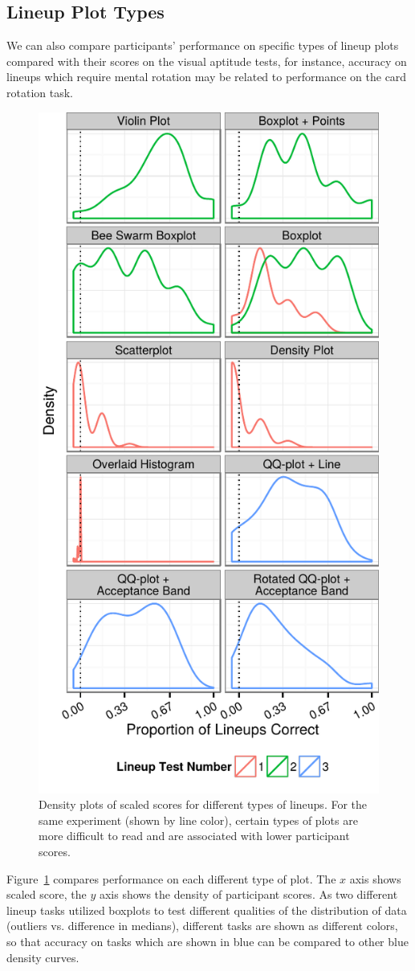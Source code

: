 \documentclass[11pt]{isuthesis}\usepackage[]{graphicx}\usepackage[]{color}
\begin{document}
\subsection{Lineup Plot Types} \label{app:plottypes}
We can also compare participants' performance on specific types of lineup plots compared with their scores on the visual aptitude tests, for instance, accuracy on lineups which require mental rotation may be related to performance on the card rotation task. 



\begin{figure}[ht]\centering
\includegraphics[width=.45\linewidth]{fig-lineup-types-1}
\caption{Density plots of scaled scores for different types of lineups. For the same experiment (shown by line color), certain types of plots are more difficult to read and are associated with lower participant scores. \label{fig:plottypesdensity}}
\end{figure}

Figure~\ref{fig:plottypesdensity} compares performance on each different type of plot. The $x$ axis shows scaled score, the $y$ axis shows the density of participant scores. As two different lineup tasks utilized boxplots to test different qualities of the distribution of data (outliers vs. difference in medians), different tasks are shown as different colors, so that accuracy on tasks which are shown in blue can be compared to other blue density curves. 
\end{document}
